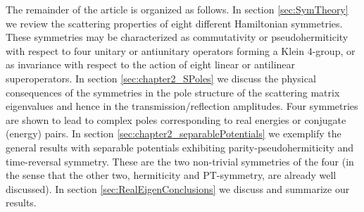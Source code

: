 

The remainder of the article is organized as follows. In section \ref{sec:SymTheory} we review the scattering properties of eight different Hamiltonian symmetries. These symmetries may be characterized as commutativity or pseudohermiticity with respect to four unitary or antiunitary operators forming a Klein $4$-group, or as invariance with respect to the action of eight linear or antilinear superoperators. In section \ref{sec:chapter2_SPoles} we discuss the physical consequences of the symmetries in the pole structure of the scattering matrix eigenvalues  and hence in the transmission/reflection amplitudes. Four symmetries are shown to lead to complex poles corresponding to real energies or conjugate (energy) pairs.  In section \ref{sec:chapter2_separablePotentials} we exemplify the general results with separable potentials exhibiting parity-pseudohermiticity and time-reversal symmetry. These are the two non-trivial symmetries of the four (in the sense that the other two, hermiticity and PT-symmetry, are already well discussed). In section \ref{sec:RealEigenConclusions} we discuss and summarize our results.

